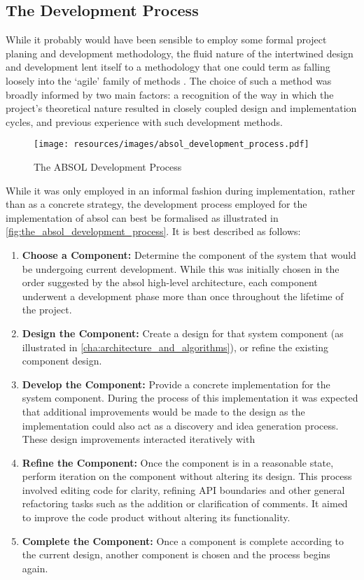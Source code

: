 \subsection{The Development Process} %
\label{sub:the_development_process}
While it probably would have been sensible to employ some formal project planing and development methodology, the fluid nature of the intertwined design and development lent itself to a methodology that one could term as falling loosely into the `agile' family of methods \citep{fowler2001agile}.
The choice of such a method was broadly informed by two main factors: a recognition of the way in which the project's theoretical nature resulted in closely coupled design and implementation cycles, and previous experience with such development methods.\\

\begin{figure}[!htb]
    \centering
    \texttt{[image: resources/images/absol\_development\_process.pdf]}
    \caption{The ABSOL Development Process}
    \label{fig:the_absol_development_process}
\end{figure}

While it was only employed in an informal fashion during implementation, rather than as a concrete strategy, the development process employed for the implementation of \gls{absol} can best be formalised as illustrated in \autoref{fig:the_absol_development_process}.
It is best described as follows:
\begin{enumerate}
    \item \textbf{Choose a Component:} Determine the component of the system that would be undergoing current development. 
    While this was initially chosen in the order suggested by the \gls{absol} high-level architecture, each component underwent a development phase more than once throughout the lifetime of the project.
    \item \textbf{Design the Component:} Create a design for that system component (as illustrated in \autoref{cha:architecture_and_algorithms}), or refine the existing component design.
    \item \textbf{Develop the Component:} Provide a concrete implementation for the system component.
    During the process of this implementation it was expected that additional improvements would be made to the design as the implementation could also act as a discovery and idea generation process.
    These design improvements interacted iteratively with 
    \item \textbf{Refine the Component:} Once the component is in a reasonable state, perform iteration on the component without altering its design.
    This process involved editing code for clarity, refining API boundaries and other general refactoring tasks such as the addition or clarification of comments. 
    It aimed to improve the code product without altering its functionality.
    \item \textbf{Complete the Component:} Once a component is complete according to the current design, another component is chosen and the process begins again.
\end{enumerate}

